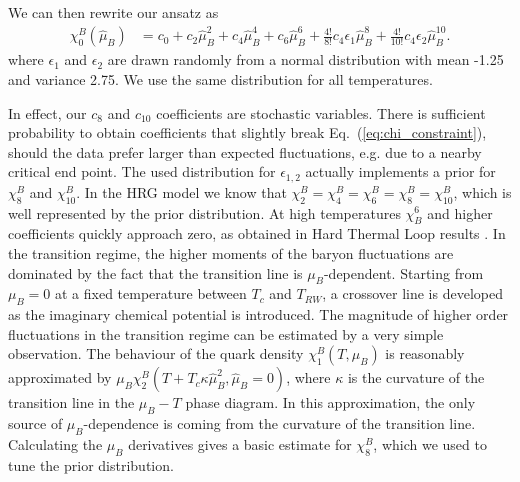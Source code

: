 \documentclass[a4paper,11pt]{article}
\begin{document}
We can then rewrite our ansatz as
\begin{align}
 \chi_0^B(\hat \mu_B) &= c_0 + c_2  \hat \mu_B^2 + c_4  \hat \mu_B^4 +c_6  \hat \mu_B^6 + \frac{4!}{8!} c_4 \epsilon_1  \hat \mu_B^8+ \frac{4!}{10!} c_4 \epsilon_2  \hat \mu_B^{10} .
 \label{deriv}
\end{align}
where $\epsilon_1$ and $\epsilon_2$ are drawn randomly from a normal distribution with mean -1.25 and variance 2.75. We use the same distribution for all temperatures.

In effect, our $c_8$ and $c_{10}$ coefficients are stochastic variables. There is sufficient probability to obtain coefficients
that slightly break Eq.~(\ref{eq:chi_constraint}), should the data prefer larger than expected fluctuations, e.g. due to
a nearby critical end point. The used distribution for $\epsilon_{1,2}$ actually implements a prior for $\chi^B_8$ and
$\chi^B_{10}$. 
In the HRG model we know that
$\chi^B_2=\chi^B_4=\chi^B_6=\chi^B_8=\chi^B_{10}$, which is well represented by
the prior distribution.  At high temperatures $\chi^6_B$ and higher
coefficients quickly approach zero, as obtained in Hard Thermal
Loop results \cite{Haque:2013sja}. In the transition regime, the higher moments of the baryon fluctuations
are dominated by the fact that the transition line is $\mu_B$-dependent. Starting from $\mu_B=0$ at a fixed
temperature between $T_c$ and $T_{RW}$, a crossover line is developed as the imaginary chemical potential is
introduced. The magnitude of higher order fluctuations in the transition regime can be estimated by a very
simple observation. The behaviour of the quark density $\chi^B_1(T,\hat\mu_B)$ is reasonably approximated
by $\mu_B \chi^B_2 ( T + T_c \kappa\hat\mu_B^2,\hat\mu_B=0)$, 
where $\kappa$ is the curvature of the transition line in the $\mu_B-T$ phase diagram. In this approximation,
the only source of $\mu_B$-dependence is coming from the curvature of the transition line.
Calculating the $\mu_B$ derivatives gives a basic estimate for $\chi^B_8$,
which we used to tune the prior distribution.
\end{document}
